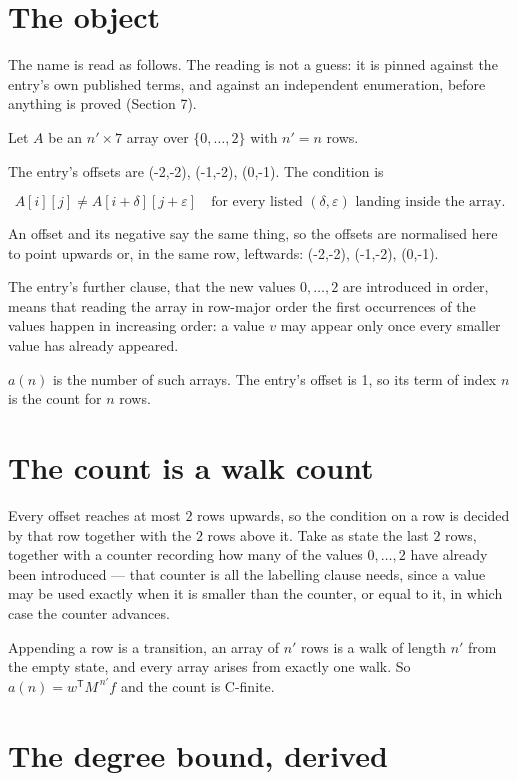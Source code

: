 \documentclass[11pt]{article}
\theoremstyle{definition}
\begin{document}
\section{The object}

The name is read as follows. The reading is not a guess: it is pinned against the entry's own published terms, and against an independent enumeration, before anything is proved (Section 7).

Let $A$ be an $n' \times 7$ array over $\{0,\dots,2\}$ with $n' = n$ rows.

The entry's offsets are (-2,-2), (-1,-2), (0,-1). The condition is

\[A[i][j] \ne A[i{+}\delta][j{+}\varepsilon]\quad\text{for every listed }(\delta,\varepsilon)\text{ landing inside the array.}\]

An offset and its negative say the same thing, so the offsets are normalised here to point upwards or, in the same row, leftwards: (-2,-2), (-1,-2), (0,-1).

The entry's further clause, that the new values $0,\dots,2$ are introduced in order, means that reading the array in row-major order the first occurrences of the values happen in increasing order: a value $v$ may appear only once every smaller value has already appeared.

$a(n)$ is the number of such arrays. The entry's offset is 1, so its term of index $n$ is the count for $n$ rows.

\section{The count is a walk count}

Every offset reaches at most $2$ rows upwards, so the condition on a row is decided by that row together with the $2$ rows above it. Take as state the last $2$ rows, together with a counter recording how many of the values $0,\dots,2$ have already been introduced --- that counter is all the labelling clause needs, since a value may be used exactly when it is smaller than the counter, or equal to it, in which case the counter advances.

Appending a row is a transition, an array of $n'$ rows is a walk of length $n'$ from the empty state, and every array arises from exactly one walk. So $a(n) = w^{\mathsf T}M^{\,n'}f$ and the count is C-finite.

\section{The degree bound, derived}
\end{document}
